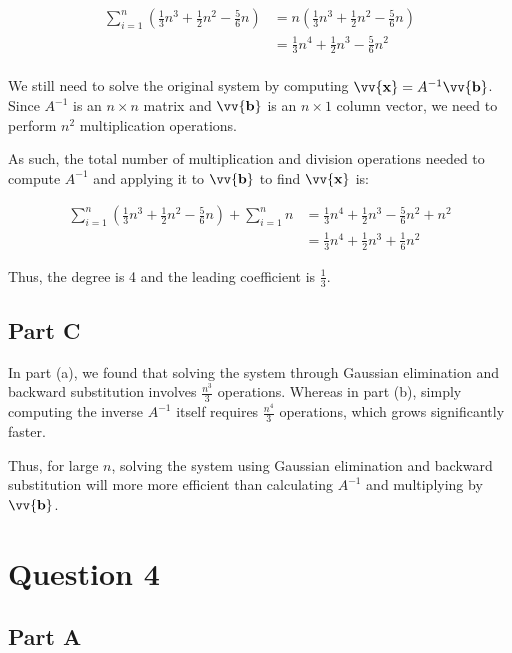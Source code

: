 \documentclass[12pt]{article}
\newcommand{\vect}[1]{\vv{\mathbf{#1}}}
\begin{document}
\begin{align*}
    \sum_{i=1}^n \left(\frac{1}{3}n^3 + \frac{1}{2}n^2 - \frac{5}{6}n \right)
    &= n \left(\frac{1}{3}n^3 + \frac{1}{2}n^2 - \frac{5}{6}n \right) \\
    &= \frac{1}{3}n^4 + \frac{1}{2}n^3 - \frac{5}{6}n^2 \\
\end{align*}

We still need to solve the original system by computing $\vect{x}=A^{-1}\vect{b}$. Since $A^{-1}$ is an $n\times n$ matrix and $\vect{b}$ is an $n\times 1$ column vector, we need to perform $n^2$ multiplication operations.

As such, the total number of multiplication and division operations needed to compute $A^{-1}$ and applying it to $\vect{b}$ to find $\vect{x}$ is:

\begin{align*}
    \sum_{i=1}^n \left(\frac{1}{3}n^3 + \frac{1}{2}n^2 - \frac{5}{6}n \right)
    + \sum_{i=1}^n n
    &= \frac{1}{3}n^4 + \frac{1}{2}n^3 - \frac{5}{6}n^2 + n^2 \\
    &= \frac{1}{3}n^4 + \frac{1}{2}n^3 + \frac{1}{6}n^2
\end{align*}

Thus, the degree is 4 and the leading coefficient is $\displaystyle\frac{1}{3}$.

\subsection*{Part C}

In part (a), we found that solving the system through Gaussian elimination and backward substitution involves $\displaystyle\frac{n^3}{3}$ operations. Whereas in part (b), simply computing the inverse $A^{-1}$ itself requires $\displaystyle\frac{n^4}{3}$ operations, which grows significantly faster.

Thus, for large $n$, solving the system using Gaussian elimination and backward substitution will more more efficient than calculating $A^{-1}$ and multiplying by $\vect{b}$.

\section*{Question 4}

\subsection*{Part A}
\end{document}

